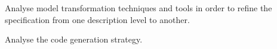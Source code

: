 \documentclass{template/openetcs_article}
\begin{document}
Analyse model transformation techniques and tools in order to refine the specification from one description level to another.



Analyse the code generation strategy.



%

\end{document}
